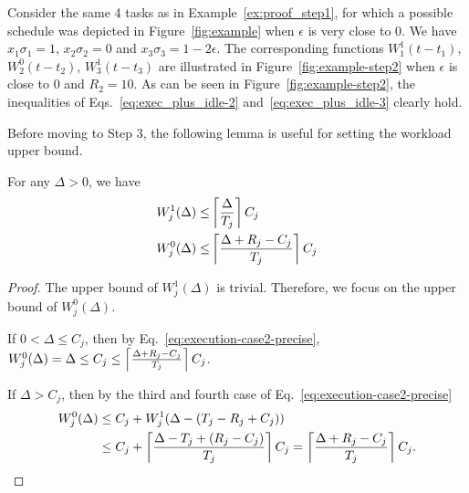 \begin{example}
Consider the same 4 tasks as in Example~\ref{ex:proof_step1}, for which a possible schedule was depicted in Figure~\ref{fig:example} when $\epsilon$ is very close to $0$. We have $x_1\sigma_1=1$, $x_2\sigma_2=0$ and $x_3\sigma_3=1-2\epsilon$. The corresponding functions
$W_1^1(t-t_1)$, $W_2^0(t-t_2)$, $W_3^1(t-t_3)$ are illustrated in
Figure~\ref{fig:example-step2} when $\epsilon$ is close to $0$ and $R_2 = 10$. 
As can be seen in Figure~\ref{fig:example-step2}, the inequalities of Eqs.~\eqref{eq:exec_plus_idle-2} and~\eqref{eq:exec_plus_idle-3} clearly hold.\myendproof
\end{example}


Before moving to Step 3, the following lemma is useful for setting the workload upper bound.
\begin{Lemma}
  \label{lemma:W_0-and-W_1-upper}
For any $\Delta > 0$, we have
\begin{align}
  W_j^1(\Delta)  \leq &\ceiling{\frac{\Delta}{T_j}}C_j %
  \label{eq:W_1-upper}\\
  W_j^0(\Delta)  \leq &\ceiling{\frac{\Delta+R_j-C_j}{T_j}}C_j %
  \label{eq:W_0-upper}
\end{align}
\end{Lemma}
\begin{proof}
  The upper bound of $W_j^1(\Delta)$ is trivial. Therefore, we focus on the upper bound of $W_j^0(\Delta)$. 
  
  If $0 < \Delta \leq C_j$, then by Eq.~\eqref{eq:execution-case2-precise}, $W_j^0(\Delta) = \Delta \leq C_j \leq \left\lceil{\frac{\Delta+R_j-C_j}{T_j}}\right\rceil C_j$. 
  
  If $\Delta > C_j$, then by the third and fourth case of Eq.~\eqref{eq:execution-case2-precise}
{\footnotesize \begin{align*}
W_j^0(\Delta) &\leq C_j + W_j^1(\Delta - (T_j-R_j+C_j))\nonumber\\
& \leq C_j+\left\lceil{\frac{\Delta-T_j +(R_j-C_j)}{T_j}}\right\rceil C_j  = \left\lceil{\frac{\Delta+R_j-C_j}{T_j}}\right\rceil C_j. 
\end{align*}} %
\end{proof}

